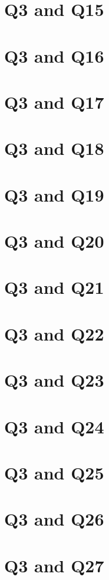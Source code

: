 \documentclass{report}
\begin{document}
\section{Q3 and Q15}\clearpage
\section{Q3 and Q16}\clearpage
\section{Q3 and Q17}\clearpage
\section{Q3 and Q18}\clearpage
\section{Q3 and Q19}\clearpage
\section{Q3 and Q20}\clearpage
\section{Q3 and Q21}\clearpage
\section{Q3 and Q22}\clearpage
\section{Q3 and Q23}\clearpage
\section{Q3 and Q24}\clearpage
\section{Q3 and Q25}\clearpage
\section{Q3 and Q26}\clearpage
\section{Q3 and Q27}\clearpage
\end{document}
